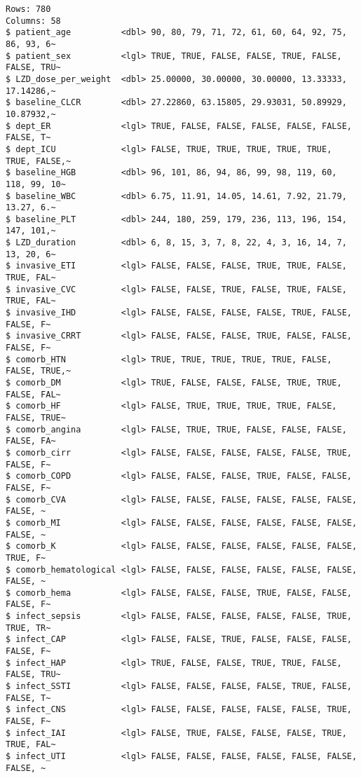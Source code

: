 \documentclass[
  letterpaper,
  DIV=11,
  numbers=noendperiod]{scrartcl}
\begin{document}
\begin{verbatim}
Rows: 780
Columns: 58
$ patient_age          <dbl> 90, 80, 79, 71, 72, 61, 60, 64, 92, 75, 86, 93, 6~
$ patient_sex          <lgl> TRUE, TRUE, FALSE, FALSE, TRUE, FALSE, FALSE, TRU~
$ LZD_dose_per_weight  <dbl> 25.00000, 30.00000, 30.00000, 13.33333, 17.14286,~
$ baseline_CLCR        <dbl> 27.22860, 63.15805, 29.93031, 50.89929, 10.87932,~
$ dept_ER              <lgl> TRUE, FALSE, FALSE, FALSE, FALSE, FALSE, FALSE, T~
$ dept_ICU             <lgl> FALSE, TRUE, TRUE, TRUE, TRUE, TRUE, TRUE, FALSE,~
$ baseline_HGB         <dbl> 96, 101, 86, 94, 86, 99, 98, 119, 60, 118, 99, 10~
$ baseline_WBC         <dbl> 6.75, 11.91, 14.05, 14.61, 7.92, 21.79, 13.27, 6.~
$ baseline_PLT         <dbl> 244, 180, 259, 179, 236, 113, 196, 154, 147, 101,~
$ LZD_duration         <dbl> 6, 8, 15, 3, 7, 8, 22, 4, 3, 16, 14, 7, 13, 20, 6~
$ invasive_ETI         <lgl> FALSE, FALSE, FALSE, TRUE, TRUE, FALSE, TRUE, FAL~
$ invasive_CVC         <lgl> FALSE, FALSE, TRUE, FALSE, TRUE, FALSE, TRUE, FAL~
$ invasive_IHD         <lgl> FALSE, FALSE, FALSE, FALSE, TRUE, FALSE, FALSE, F~
$ invasive_CRRT        <lgl> FALSE, FALSE, FALSE, TRUE, FALSE, FALSE, FALSE, F~
$ comorb_HTN           <lgl> TRUE, TRUE, TRUE, TRUE, TRUE, FALSE, FALSE, TRUE,~
$ comorb_DM            <lgl> TRUE, FALSE, FALSE, FALSE, TRUE, TRUE, FALSE, FAL~
$ comorb_HF            <lgl> FALSE, TRUE, TRUE, TRUE, TRUE, FALSE, FALSE, TRUE~
$ comorb_angina        <lgl> FALSE, TRUE, TRUE, FALSE, FALSE, FALSE, FALSE, FA~
$ comorb_cirr          <lgl> FALSE, FALSE, FALSE, FALSE, FALSE, TRUE, FALSE, F~
$ comorb_COPD          <lgl> FALSE, FALSE, FALSE, TRUE, FALSE, FALSE, FALSE, F~
$ comorb_CVA           <lgl> FALSE, FALSE, FALSE, FALSE, FALSE, FALSE, FALSE, ~
$ comorb_MI            <lgl> FALSE, FALSE, FALSE, FALSE, FALSE, FALSE, FALSE, ~
$ comorb_K             <lgl> FALSE, FALSE, FALSE, FALSE, FALSE, FALSE, TRUE, F~
$ comorb_hematological <lgl> FALSE, FALSE, FALSE, FALSE, FALSE, FALSE, FALSE, ~
$ comorb_hema          <lgl> FALSE, FALSE, FALSE, TRUE, FALSE, FALSE, FALSE, F~
$ infect_sepsis        <lgl> FALSE, FALSE, FALSE, FALSE, FALSE, TRUE, TRUE, TR~
$ infect_CAP           <lgl> FALSE, FALSE, TRUE, FALSE, FALSE, FALSE, FALSE, F~
$ infect_HAP           <lgl> TRUE, FALSE, FALSE, TRUE, TRUE, FALSE, FALSE, TRU~
$ infect_SSTI          <lgl> FALSE, FALSE, FALSE, FALSE, TRUE, FALSE, FALSE, T~
$ infect_CNS           <lgl> FALSE, FALSE, FALSE, FALSE, FALSE, TRUE, FALSE, F~
$ infect_IAI           <lgl> FALSE, TRUE, FALSE, FALSE, FALSE, TRUE, TRUE, FAL~
$ infect_UTI           <lgl> FALSE, FALSE, FALSE, FALSE, FALSE, FALSE, FALSE, ~

\end{verbatim}
\end{document}
